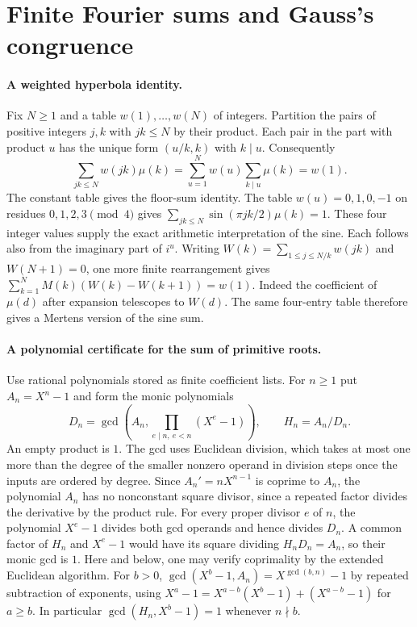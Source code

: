 \section{Finite Fourier sums and Gauss's congruence}
\label{sec:fourier}

\paragraph{A weighted hyperbola identity.}
Fix $N\ge1$ and a table $w(1),\ldots,w(N)$ of integers. Partition the
pairs of positive integers $j,k$ with $jk\le N$ by their product. Each
pair in the part with product $u$ has the unique form $(u/k,k)$ with
$k\mid u$. Consequently
\[
   \sum_{jk\le N} w(jk)\mu(k)
    =\sum_{u=1}^N w(u)\sum_{k\mid u}\mu(k)=w(1).
\]
The constant table gives the floor-sum identity. The table
$w(u)=0,1,0,-1$ on residues $0,1,2,3\pmod4$ gives
$\sum_{jk\le N}\sin(\pi jk/2)\mu(k)=1$. These four integer values
supply the exact arithmetic interpretation of the sine. Each follows also
from the imaginary part of $i^u$.
Writing $W(k)=\sum_{1\le j\le N/k}w(jk)$ and $W(N+1)=0$, one more
finite rearrangement gives $\sum_{k=1}^N M(k)(W(k)-W(k+1))=w(1)$.
Indeed the coefficient of $\mu(d)$ after expansion telescopes to $W(d)$.
The same four-entry table therefore gives a Mertens version of the sine sum.


\paragraph{A polynomial certificate for the sum of primitive roots.}
Use rational polynomials stored as finite coefficient lists. For $n\ge1$
put $A_n=X^n-1$ and form the monic polynomials
\[
 D_n=\gcd\!\left(A_n,\prod_{e\mid n,\ e<n}(X^e-1)\right),
 \qquad H_n=A_n/D_n .
\]
An empty product is $1$. The gcd uses Euclidean division, which takes at
most one more than the degree of the smaller nonzero operand in division steps once the inputs are ordered by degree.
Since $A_n'=nX^{n-1}$ is coprime to $A_n$, the polynomial $A_n$ has no
nonconstant square divisor, since a repeated factor divides the derivative
by the product rule. For every proper divisor $e$ of $n$, the polynomial
$X^e-1$ divides both gcd operands and hence divides $D_n$. A common
factor of $H_n$ and $X^e-1$ would have its square dividing $H_nD_n=A_n$,
so their monic gcd is $1$. Here and below, one may verify coprimality by
the extended Euclidean algorithm. For $b>0$,
$\gcd(X^b-1,A_n)=X^{\gcd(b,n)}-1$ by repeated subtraction of
exponents, using
$X^a-1=X^{a-b}(X^b-1)+(X^{a-b}-1)$ for $a\ge b$.
In particular $\gcd(H_n,X^b-1)=1$ whenever $n\nmid b$.

